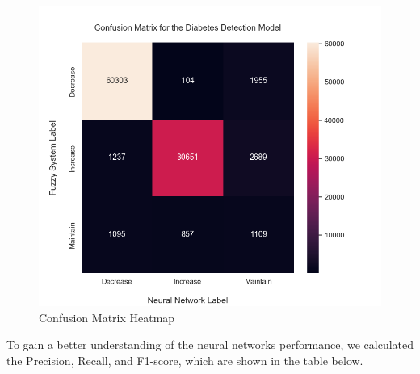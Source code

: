 \documentclass[titlepage]{article}
\begin{document}
\begin{figure}[H]
\centering
\includegraphics[scale=0.5]{../images/classification/confusion_heatmap}
\caption{Confusion Matrix Heatmap}
\label{fig:confusion_matrix_heatmap}
\end{figure}

To gain a better understanding of the neural networks performance, we calculated the Precision, Recall, and F1-score, which are shown in the table below.

\begin{table}[H]
    \centering
    \caption{}
    \label{tab:classification_scores}
    
\end{table}
\end{document}
